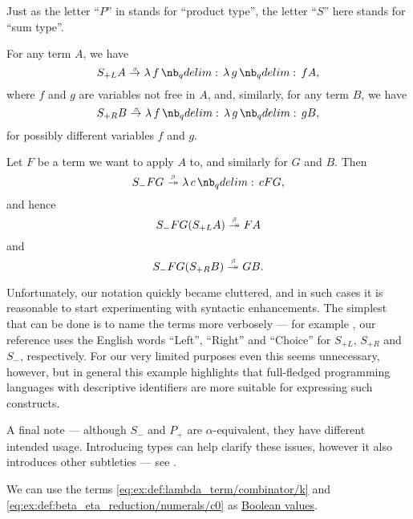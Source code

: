 \begin{example}
\begin{thmenum}
    Just as the letter \enquote{\( P \)} in  stands for \enquote{product type}, the letter \enquote{\( S \)} here stands for \enquote{sum type}.

    For any term \( A \), we have
    \begin{equation*}
      S_{+L} A \bred \qabs f \qabs g f A,
    \end{equation*}
    where \( f \) and \( g \) are variables not free in \( A \), and, similarly, for any term \( B \), we have
    \begin{equation*}
      S_{+R} B \bred \qabs f \qabs g g B,
    \end{equation*}
    for possibly different variables \( f \) and \( g \).

    Let \( F \) be a term we want to apply \( A \) to, and similarly for \( G \) and \( B \). Then
    \begin{equation*}
      S_- F G \bred* \qabs c c F G,
    \end{equation*}
    and hence
    \begin{equation*}
      S_- F G (S_{+L} A) \bred* F A
    \end{equation*}
    and
    \begin{equation*}
      S_- F G (S_{+R} B) \bred* G B.
    \end{equation*}

    Unfortunately, our notation quickly became cluttered, and in such cases it is reasonable to start experimenting with syntactic enhancements. The simplest that can be done is to name the terms more verbosely --- for example , our reference \cite{MathOF:product_type_in_simply_typed_lambda_terms} uses the English words \enquote{Left}, \enquote{Right} and \enquote{Choice} for \( S_{+L} \), \( S_{+R} \) and \( S_- \), respectively. For our very limited purposes even this seems unnecessary, however, but in general this example highlights that full-fledged programming languages with descriptive identifiers are more suitable for expressing such constructs.

    A final note --- although \( S_- \) and \( P_+ \) are \( \alpha \)-equivalent, they have different intended usage. Introducing types can help clarify these issues, however it also introduces other subtleties --- see .

     We can use the terms \ref{eq:ex:def:lambda_term/combinator/k} and \ref{eq:ex:def:beta_eta_reduction/numerals/c0} as \hyperref[con:boolean_value]{Boolean values}.


\end{thmenum}
\end{example}
